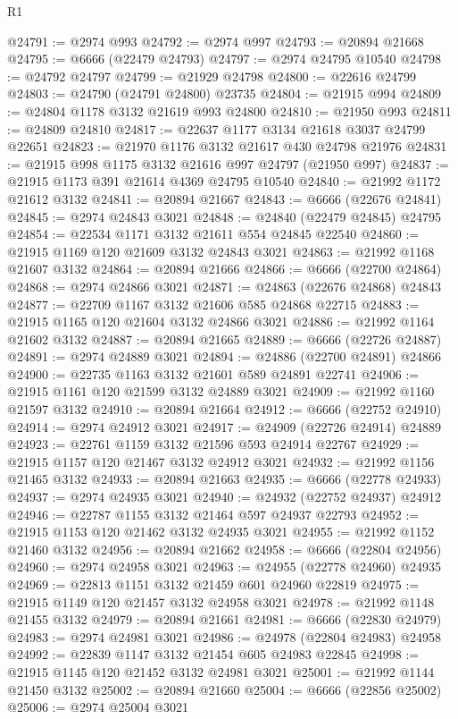 \begin{lexlean}{R1}
\begin{coremodule}
@24791 := @2974 @993
@24792 := @2974 @997
@24793 := @20894 @21668
@24795 := @6666 (@22479 @24793)
@24797 := @2974 @24795 @10540
@24798 := @24792 @24797
@24799 := @21929 @24798
@24800 := @22616 @24799
@24803 := @24790 (@24791 @24800) @23735
@24804 := @21915 @994
@24809 := @24804 @1178 @3132 @21619 @993 @24800
@24810 := @21950 @993
@24811 := @24809 @24810
@24817 := @22637 @1177 @3134 @21618 @3037 @24799 @22651
@24823 := @21970 @1176 @3132 @21617 @430 @24798 @21976
@24831 := @21915 @998 @1175 @3132 @21616 @997 @24797 (@21950 @997)
@24837 := @21915 @1173 @391 @21614 @4369 @24795 @10540
@24840 := @21992 @1172 @21612 @3132
@24841 := @20894 @21667
@24843 := @6666 (@22676 @24841)
@24845 := @2974 @24843 @3021
@24848 := @24840 (@22479 @24845) @24795
@24854 := @22534 @1171 @3132 @21611 @554 @24845 @22540
@24860 := @21915 @1169 @120 @21609 @3132 @24843 @3021
@24863 := @21992 @1168 @21607 @3132
@24864 := @20894 @21666
@24866 := @6666 (@22700 @24864)
@24868 := @2974 @24866 @3021
@24871 := @24863 (@22676 @24868) @24843
@24877 := @22709 @1167 @3132 @21606 @585 @24868 @22715
@24883 := @21915 @1165 @120 @21604 @3132 @24866 @3021
@24886 := @21992 @1164 @21602 @3132
@24887 := @20894 @21665
@24889 := @6666 (@22726 @24887)
@24891 := @2974 @24889 @3021
@24894 := @24886 (@22700 @24891) @24866
@24900 := @22735 @1163 @3132 @21601 @589 @24891 @22741
@24906 := @21915 @1161 @120 @21599 @3132 @24889 @3021
@24909 := @21992 @1160 @21597 @3132
@24910 := @20894 @21664
@24912 := @6666 (@22752 @24910)
@24914 := @2974 @24912 @3021
@24917 := @24909 (@22726 @24914) @24889
@24923 := @22761 @1159 @3132 @21596 @593 @24914 @22767
@24929 := @21915 @1157 @120 @21467 @3132 @24912 @3021
@24932 := @21992 @1156 @21465 @3132
@24933 := @20894 @21663
@24935 := @6666 (@22778 @24933)
@24937 := @2974 @24935 @3021
@24940 := @24932 (@22752 @24937) @24912
@24946 := @22787 @1155 @3132 @21464 @597 @24937 @22793
@24952 := @21915 @1153 @120 @21462 @3132 @24935 @3021
@24955 := @21992 @1152 @21460 @3132
@24956 := @20894 @21662
@24958 := @6666 (@22804 @24956)
@24960 := @2974 @24958 @3021
@24963 := @24955 (@22778 @24960) @24935
@24969 := @22813 @1151 @3132 @21459 @601 @24960 @22819
@24975 := @21915 @1149 @120 @21457 @3132 @24958 @3021
@24978 := @21992 @1148 @21455 @3132
@24979 := @20894 @21661
@24981 := @6666 (@22830 @24979)
@24983 := @2974 @24981 @3021
@24986 := @24978 (@22804 @24983) @24958
@24992 := @22839 @1147 @3132 @21454 @605 @24983 @22845
@24998 := @21915 @1145 @120 @21452 @3132 @24981 @3021
@25001 := @21992 @1144 @21450 @3132
@25002 := @20894 @21660
@25004 := @6666 (@22856 @25002)
@25006 := @2974 @25004 @3021

\end{coremodule}
\end{lexlean}
